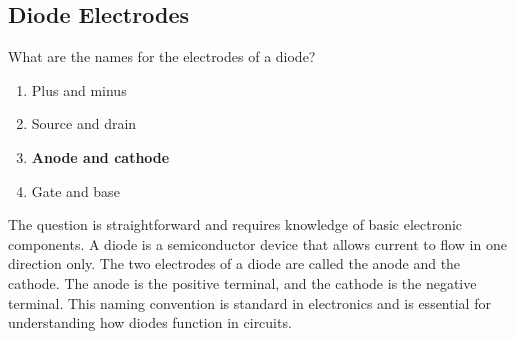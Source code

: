 \subsection{Diode Electrodes}
\label{T6B09}

\begin{tcolorbox}[colback=gray!10!white,colframe=black!75!black,title=T6B09]
What are the names for the electrodes of a diode?
\begin{enumerate}[noitemsep]
    \item Plus and minus
    \item Source and drain
    \item \textbf{Anode and cathode}
    \item Gate and base
\end{enumerate}
\end{tcolorbox}

The question is straightforward and requires knowledge of basic electronic components. A diode is a semiconductor device that allows current to flow in one direction only. The two electrodes of a diode are called the anode and the cathode. The anode is the positive terminal, and the cathode is the negative terminal. This naming convention is standard in electronics and is essential for understanding how diodes function in circuits.